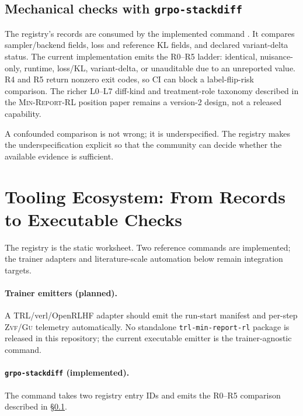 \documentclass[11pt]{article}
\newcommand{\zvf}{\textsc{Zvf}}
\newcommand{\gu}{\textsc{Gu}}
\newcommand{\minreport}{\textsc{Min-Report-RL}}
\begin{document}
\subsection{Mechanical checks with \texttt{grpo-stackdiff}}
\label{sec:mechanical}

The registry's records are consumed by the implemented command
\cite{minreportrl2026}. It compares sampler/backend fields, loss and reference
KL fields, and declared variant-delta status. The current implementation emits
the R0--R5 ladder: identical, nuisance-only, runtime, loss/KL, variant-delta,
or unauditable due to an unreported value. R4 and R5 return nonzero exit codes,
so CI can block a label-flip-risk comparison. The richer L0--L7 diff-kind and
treatment-role taxonomy described in the \minreport{} position paper remains
a version-2 design, not a released capability.

A confounded comparison is not wrong; it is underspecified. The registry makes
the underspecification explicit so that the community can decide whether the
available evidence is sufficient.

\section{Tooling Ecosystem: From Records to Executable Checks}
\label{sec:tools}


The registry is the static worksheet. Two reference commands are implemented;
the trainer adapters and literature-scale automation below remain integration
targets.

\paragraph{Trainer emitters (planned).} A TRL/verl/OpenRLHF adapter should emit
the run-start manifest and per-step \zvf{}/\gu{} telemetry automatically. No
standalone \texttt{trl-min-report-rl} package is released in this repository;
the current executable emitter is the trainer-agnostic
 command.

\paragraph{\texttt{grpo-stackdiff} (implemented).} The
 command takes two registry entry IDs and
emits the R0--R5 comparison described in \S\ref{sec:mechanical}.
\end{document}
